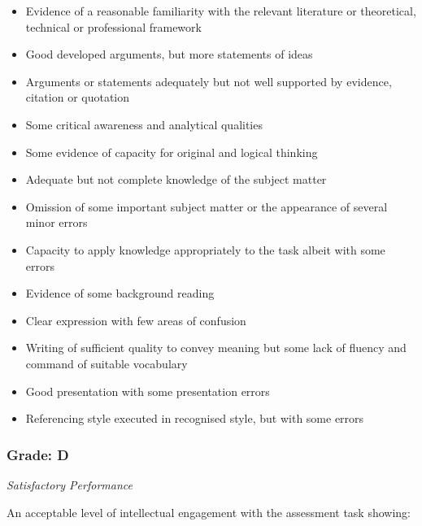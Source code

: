 \documentclass[12pt,a4paper]{article}
\begin{document}
\begin{itemize}
	\item Evidence of a reasonable familiarity with the relevant literature or theoretical, technical or professional framework
	\item Good developed arguments, but more statements of ideas
	\item Arguments or statements adequately but not well supported by evidence, citation or quotation
	\item Some critical awareness and analytical qualities
	\item Some evidence of capacity for original and logical thinking
	\item Adequate but not complete
	knowledge of the subject matter
	\item Omission of some important subject matter or the appearance of several minor errors
	\item Capacity to apply knowledge appropriately to the task albeit with some errors
	\item Evidence of some background reading
	\item Clear expression with few areas of confusion
	\item Writing of sufficient quality to convey meaning but some lack of fluency and command of suitable vocabulary
	\item Good presentation with some presentation errors
	\item Referencing style executed in recognised style, but with some errors
\end{itemize}

\subsubsection*{Grade: D}

\textit{Satisfactory Performance}

An acceptable level of intellectual engagement with the assessment task showing:
\end{document}
